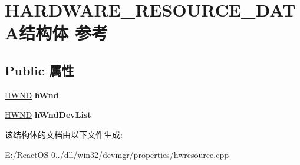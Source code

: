 \hypertarget{struct_h_a_r_d_w_a_r_e___r_e_s_o_u_r_c_e___d_a_t_a}{}\section{H\+A\+R\+D\+W\+A\+R\+E\+\_\+\+R\+E\+S\+O\+U\+R\+C\+E\+\_\+\+D\+A\+T\+A结构体 参考}
\label{struct_h_a_r_d_w_a_r_e___r_e_s_o_u_r_c_e___d_a_t_a}
\subsection*{Public 属性}
\begin{DoxyCompactItemize}
\item 
\mbox{\label{struct_h_a_r_d_w_a_r_e___r_e_s_o_u_r_c_e___d_a_t_a_a58ae8bb6260d4676ee4551973191ebc8}} 
\hyperlink{interfacevoid}{H\+W\+ND} {\bfseries h\+Wnd}
\item 
\mbox{\label{struct_h_a_r_d_w_a_r_e___r_e_s_o_u_r_c_e___d_a_t_a_a01fd8b3d6b4ebfac2c9a4542a046ffe2}} 
\hyperlink{interfacevoid}{H\+W\+ND} {\bfseries h\+Wnd\+Dev\+List}
\end{DoxyCompactItemize}


该结构体的文档由以下文件生成\+:\begin{DoxyCompactItemize}
\item 
E\+:/\+React\+O\+S-\/0../dll/win32/devmgr/properties/hwresource.\+cpp\end{DoxyCompactItemize}
